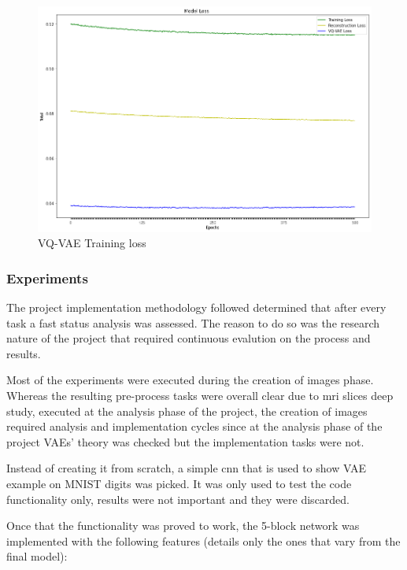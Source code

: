 \begin{figure}[ht]
    \includegraphics[width = 17cm]{images/vqvae-loss-results.png}
    \caption[VQ-VAE Training loss]{VQ-VAE Training loss}
    \label{fig:vqvae-training-loss}
\end{figure}


\FloatBarrier

\subsubsection{Experiments}

The project implementation methodology followed determined that after every task a fast status analysis was assessed. The reason to do so was the research nature of the project that required continuous evalution on the process and results.

Most of the experiments were executed during the creation of images phase. Whereas the resulting pre-process tasks were overall clear due to  \acrshort{mri} slices deep study, executed at the analysis phase of the project, the creation of images required analysis and implementation cycles since at the analysis phase of the project VAEs' theory was checked but the implementation tasks were not.

Instead of creating it from scratch, a simple \acrfull{cnn} that is used to show VAE example on MNIST \cite{mnist} digits was picked. It was only used to test the code functionality only, results were not important and they were discarded. 

Once that the functionality was proved to work, the 5-block network was implemented with the following features (details only the ones that vary from the final model):

